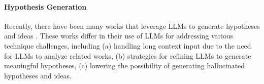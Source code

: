 


\paragraph{Hypothesis Generation}


Recently, there have been many works that leverage LLMs to generate hypotheses and ideas \cite{liu2024literature, yang2024moose, chai2024exploring, qi2024large, wang2023scientific, xiong2024improving}.
These works differ in their use of LLMs for addressing various technique challenges, including (a) handling long context input due to the need for LLMs to analyze related works, (b) strategies for refining LLMs to generate meaningful hypotheses, (c) lowering the possibility of generating hallucinated hypotheses and ideas. 

